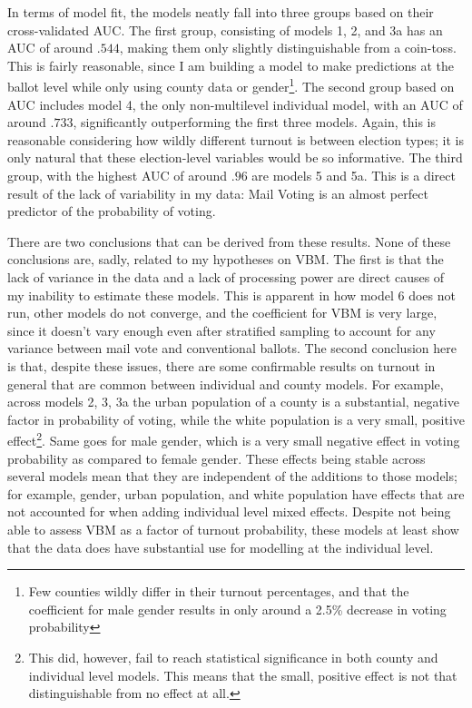 \documentclass[12pt,twoside]{reedthesis}
\begin{document}
  In terms of model fit, the models neatly fall into three groups based on
  their cross-validated AUC. The first group, consisting of models 1, 2,
  and 3a has an AUC of around \(.544\), making them only slightly
  distinguishable from a coin-toss. This is fairly reasonable, since I am
  building a model to make predictions at the ballot level while only
  using county data or gender\footnote{Few counties wildly differ in their
    turnout percentages, and that the coefficient for male gender results
    in only around a 2.5\% decrease in voting probability}. The second
  group based on AUC includes model 4, the only non-multilevel individual
  model, with an AUC of around \(.733\), significantly outperforming the
  first three models. Again, this is reasonable considering how wildly
  different turnout is between election types; it is only natural that
  these election-level variables would be so informative. The third group,
  with the highest AUC of around \(.96\) are models 5 and 5a. This is a
  direct result of the lack of variability in my data: Mail Voting is an
  almost perfect predictor of the probability of voting.
  
  There are two conclusions that can be derived from these results. None
  of these conclusions are, sadly, related to my hypotheses on VBM. The
  first is that the lack of variance in the data and a lack of processing
  power are direct causes of my inability to estimate these models. This
  is apparent in how model 6 does not run, other models do not converge,
  and the coefficient for VBM is very large, since it doesn't vary enough
  even after stratified sampling to account for any variance between mail
  vote and conventional ballots. The second conclusion here is that,
  despite these issues, there are some confirmable results on turnout in
  general that are common between individual and county models. For
  example, across models 2, 3, 3a the urban population of a county is a
  substantial, negative factor in probability of voting, while the white
  population is a very small, positive effect\footnote{This did, however,
    fail to reach statistical significance in both county and individual
    level models. This means that the small, positive effect is not that
    distinguishable from no effect at all.}. Same goes for male gender,
  which is a very small negative effect in voting probability as compared
  to female gender. These effects being stable across several models mean
  that they are independent of the additions to those models; for example,
  gender, urban population, and white population have effects that are not
  accounted for when adding individual level mixed effects. Despite not
  being able to assess VBM as a factor of turnout probability, these
  models at least show that the data does have substantial use for
  modelling at the individual level.
  
\end{document}
